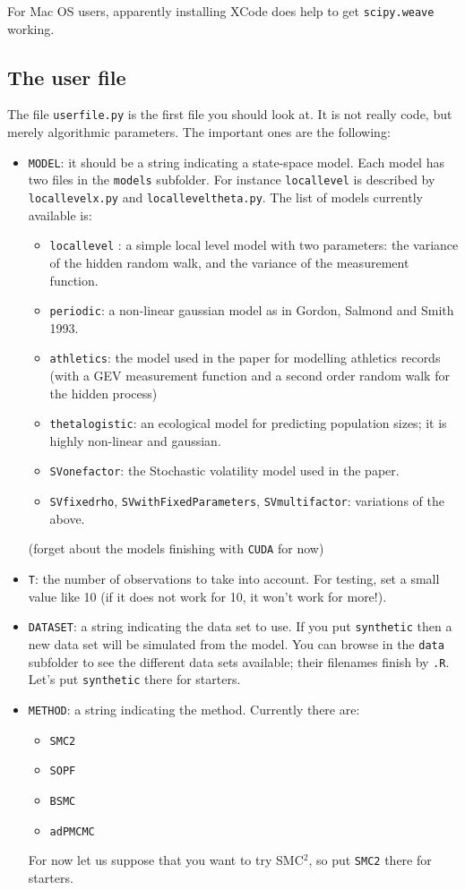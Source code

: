 \documentclass[a4paper,10pt]{paper}
\begin{document}
For Mac OS users, apparently installing XCode does help to get
\texttt{scipy.weave} working.

\subsection{The user file}

The file \texttt{userfile.py} is the first file you should look at. It is not really code, but merely 
algorithmic parameters. The important ones are the following:
\begin{itemize}
 \item \texttt{MODEL}: it should be a string indicating a state-space model. Each model has two files in the \texttt{models} subfolder. For instance
\texttt{locallevel} is described by \texttt{locallevelx.py} and \texttt{localleveltheta.py}. The list of models currently available is:
\begin{itemize}
 \item \texttt{locallevel} : a simple local level model with two parameters: the variance of the hidden random walk, and the variance of the measurement function.
 \item \texttt{periodic}: a non-linear gaussian model as in Gordon, Salmond and Smith 1993.
 \item \texttt{athletics}: the model used in the paper for modelling athletics records (with a GEV measurement function and a second order random walk for the hidden process)
 \item \texttt{thetalogistic}: an ecological model for predicting population sizes; it is highly non-linear and gaussian.
 \item \texttt{SVonefactor}: the Stochastic volatility model used in the paper.
 \item \texttt{SVfixedrho}, \texttt{SVwithFixedParameters}, \texttt{SVmultifactor}: variations of the above.
\end{itemize}
(forget about the models finishing with \texttt{CUDA} for now)
\item \texttt{T}: the number of observations to take into account. For testing, set a small value like 10 (if it does not work for 10, it won't work for more!).
\item \texttt{DATASET}: a string indicating the data set to use. If you put \texttt{synthetic} then a new data set will be simulated from the model.
You can browse in the \texttt{data} subfolder to see the different data sets available; their filenames finish by \texttt{.R}. Let's put \texttt{synthetic} there for starters.
\item \texttt{METHOD}: a string indicating the method. Currently there are:
\begin{itemize}
 \item \texttt{SMC2}
 \item \texttt{SOPF}
 \item \texttt{BSMC}
 \item \texttt{adPMCMC}
\end{itemize}
For now let us suppose that you want to try SMC$^2$, so put \texttt{SMC2} there for starters.
\end{itemize}
\end{document}
